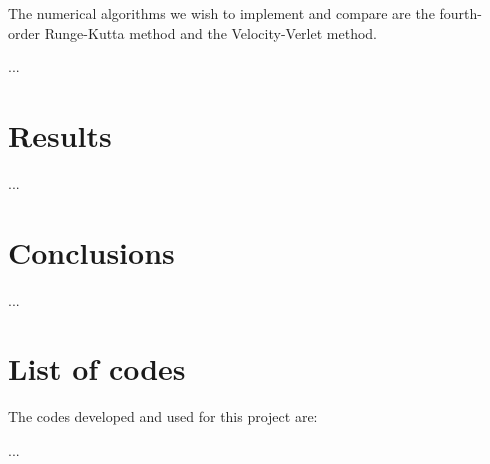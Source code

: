 \documentclass{article}
\begin{document}
\begin{multicols}{2}
The numerical algorithms we wish to implement and compare are the fourth-order Runge-Kutta method and the Velocity-Verlet method.

...




\section{Results}

...


\section{Conclusions}

...




\section{List of codes}

The codes developed and used for this project are:\

...

\end{multicols}
\end{document}
